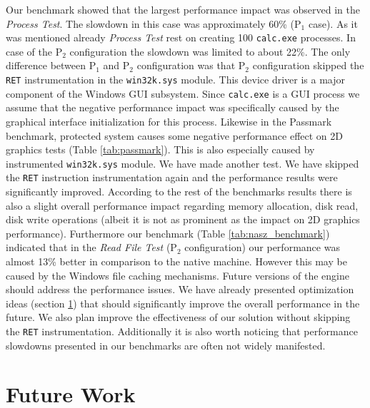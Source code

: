 \documentclass[10pt,twocolumn,a4paper]{article}
\begin{document}
Our benchmark showed that the largest performance impact was observed in the {\textit{Process Test}}. The slowdown in this case was approximately 60\% (P$_1$ case). As it was mentioned already {\textit{Process Test}} rest on creating 100 {\tt{calc.exe}} processes. In case of the P$_2$ configuration the slowdown was limited to about 22\%. The only difference between P$_1$ and P$_2$ configuration was that P$_2$ configuration skipped the {\tt{RET}} instrumentation in the {\tt{win32k.sys}} module. This device driver is a major component of the Windows GUI subsystem. Since {\tt{calc.exe}} is a GUI process we assume that the negative performance impact was specifically caused by the graphical interface initialization for this process. Likewise in the Passmark benchmark, protected system causes some negative performance effect on 2D graphics tests (Table \ref{tab:passmark}). This is also especially caused by instrumented {\tt{win32k.sys}} module. We have made another test. We have skipped the {\tt{RET}} instruction instrumentation again and the performance results were significantly improved. According to the rest of the benchmarks results there is also a slight overall performance impact regarding memory allocation, disk read, disk write operations (albeit it is not as prominent as the impact on 2D graphics performance). Furthermore our benchmark (Table \ref{tab:nasz_benchmark}) indicated that in the {\textit{Read File Test}} (P$_2$ configuration) our performance was almost 13\% better in comparison to the native machine. However this may be caused by the Windows file caching mechanisms. 
{\newline\indent}Future versions of the engine should address the performance issues. We have already presented optimization ideas (section \ref{sec:future_work}) that should significantly improve the overall performance in the future. We also plan improve the effectiveness of our solution without skipping the {\tt{RET}} instrumentation. Additionally it is also worth noticing that performance slowdowns presented in our benchmarks are often not widely manifested. 


\section{Future Work}\label{sec:future_work}
\end{document}
